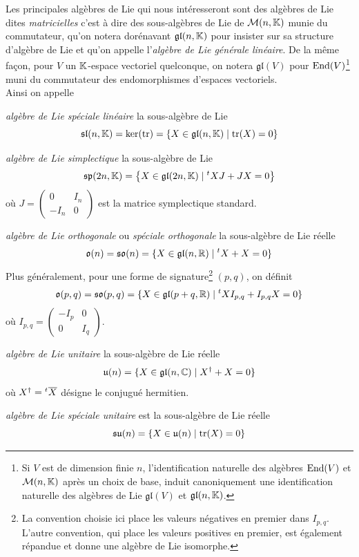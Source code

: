Les principales algèbres de Lie qui nous intéresseront sont des algèbres de Lie dites \emph{matricielles} c'est à dire des sous-algèbres de Lie de $\mathcal{M}(n, \mathbb{K})$ munie du commutateur, qu'on notera dorénavant $\mathfrak{gl}(n, \mathbb{K})$ pour insister sur sa structure d'algèbre de Lie et qu'on appelle l'\emph{algèbre de Lie générale linéaire}. De la même façon, pour $V$ un $\mathbb{K}$-espace vectoriel quelconque, on notera $\mathfrak{gl}(V)$ pour $\operatorname{End}(V)$\footnote{Si $V$ est de dimension finie $n$, l'identification naturelle des algèbres $\operatorname{End}(V)$ et $\mathcal{M}(n, \mathbb{K})$ après un choix de base, induit canoniquement une identification naturelle des algèbres de Lie $\mathfrak{gl}(V)$ et $\mathfrak{gl}(n, \mathbb{K})$.} muni du commutateur des endomorphismes d'espaces vectoriels. \\
Ainsi on appelle 
\begin{ilist}
    \item \emph{algèbre de Lie spéciale linéaire} la sous-algèbre de Lie 
    $$\mathfrak{sl}(n, \mathbb{K}) = \ker(\operatorname{tr}) = \{ X \in \mathfrak{gl}(n, \mathbb{K}) \mid \operatorname{tr}(X) = 0 \}$$
    \item \emph{algèbre de Lie simplectique} la sous-algèbre de Lie 
    $$\mathfrak{sp}(2n, \mathbb{K}) = \left\{ X \in \mathfrak{gl}(2n, \mathbb{K}) \mid {}^tX J + J X = 0 \right\}$$
    où $J = \begin{pmatrix} 0 & I_n \\ -I_n & 0 \end{pmatrix}$ est la matrice symplectique standard.
    \item \emph{algèbre de Lie orthogonale} ou \emph{spéciale orthogonale} la sous-algèbre de Lie réelle
    $$\mathfrak{o}(n) = \mathfrak{so}(n) = \{ X \in \mathfrak{gl}(n, \mathbb{R}) \mid {}^tX + X = 0 \}$$
    Plus généralement, pour une forme de signature\footnote{La convention choisie ici place les valeurs négatives en premier dans $I_{p,q}$. L'autre convention, qui place les valeurs positives en premier, est également répandue et donne une algèbre de Lie isomorphe.} $(p, q)$, on définit
    $$\mathfrak{o}(p, q) = \mathfrak{so}(p, q) = \{ X \in \mathfrak{gl}(p+q, \mathbb{R}) \mid {}^tX I_{p,q} + I_{p,q} X = 0 \}$$
    où $I_{p,q} = \begin{pmatrix} -I_p & 0 \\ 0 & I_q \end{pmatrix}$.
    \item \emph{algèbre de Lie unitaire} la sous-algèbre de Lie réelle 
    $$\mathfrak{u}(n) = \{ X \in \mathfrak{gl}(n, \mathbb{C}) \mid X^\dagger + X = 0 \}$$
    où $X^\dagger = {}^t{\overline{X}}$ désigne le conjugué hermitien. 
    \item \emph{algèbre de Lie spéciale unitaire} est la sous-algèbre de Lie réelle
    $$\mathfrak{su}(n) = \{ X \in \mathfrak{u}(n) \mid \operatorname{tr}(X) = 0 \}$$
\end{ilist}

